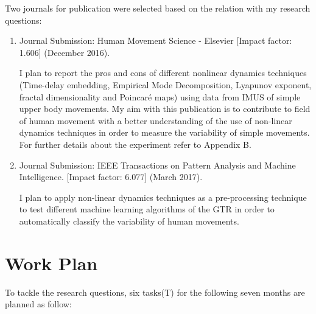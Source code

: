 \documentclass[9pt,journal,onecolumn,compsoc]{IEEEtran}
\begin{document}
Two journals for publication 
were selected based on the relation with my research questions:


\begin{enumerate}
 \item Journal Submission: Human Movement Science - Elsevier [Impact factor: 1.606] (December 2016).
 
I plan to report the pros and cons of different nonlinear dynamics techniques 
(Time-delay embedding, Empirical Mode Decomposition, Lyapunov exponent, fractal dimensionality and Poincar\'e maps)
using data from IMUS of simple upper body movements.
My aim with this publication is to contribute to field of human movement 
with a better understanding of the use of non-linear dynamics techniques 
in order to measure the variability of simple movements. 
For further details about the experiment refer to Appendix B.


\item Journal Submission: IEEE Transactions on Pattern Analysis and Machine Intelligence.
[Impact factor: 6.077] (March 2017).

I plan to apply non-linear dynamics techniques as a pre-processing technique 
to test different machine learning algorithms of the GTR in order 
to automatically classify the variability of human movements. 

\end{enumerate}




\section{Work Plan} 
To tackle the research questions,
six tasks(T) for the following seven months are planned as follow:
\end{document}
